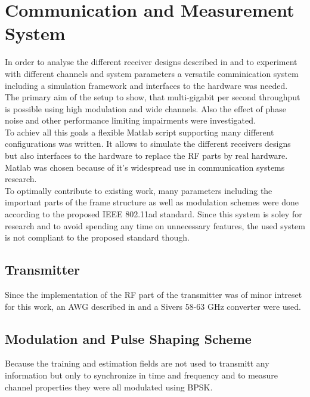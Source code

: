 \chapter{Communication and Measurement System}
In order to analyse the different receiver designs described in
 and to experiment with different channels
and system parameters a versatile comminication system
including a simulation framework and interfaces to the hardware
was needed. \\

The primary aim of the setup to show, that multi-gigabit per second
throughput is possible using high modulation and wide channels.
Also the effect of phase noise and other performance limiting impairments
were investigated. \\

To achiev all this goals a flexible Matlab script supporting
many different configurations was written. It allows to simulate
the different receivers designs but also interfaces to the hardware
to replace the \gls{RF} parts by real hardware. Matlab was chosen
because of it's widespread use in communication systems research. \\

To optimally contribute to existing work, many parameters including
the important parts of the frame structure as well as modulation
schemes were done according to the proposed IEEE 802.11ad standard.
Since this system is soley for research and to avoid spending any
time on unnecessary features, the used system is not compliant to the
proposed standard though. \\

\section{Transmitter}
Since the implementation of the \gls{RF} part of the
transmitter was of minor intreset for this work,
an \gls{AWG} described in 
and a Sivers 58-63 GHz converter were used. \\

\section{Modulation and Pulse Shaping Scheme}
Because the training and estimation fields are not used to 
transmitt any information but only to synchronize in time
and frequency and to measure channel properties they were all
modulated using \gls{BPSK}. \\

